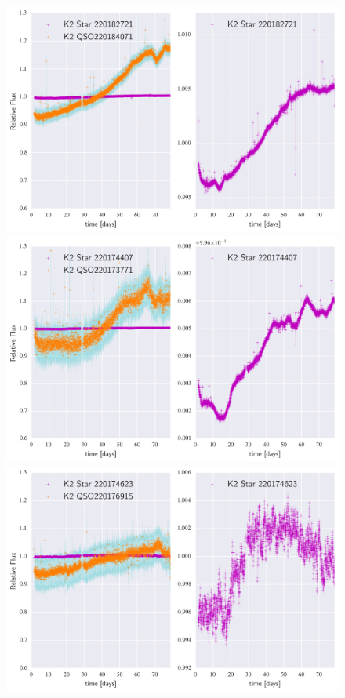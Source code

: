 \documentclass[a4paper,fleqn,usenatbib]{mnras}
\begin{document}
          
       \begin{figure}
 	\includegraphics[width=\columnwidth]{220184071NearestNeighbor.png}
 	\includegraphics[width=\columnwidth]{220173771NearestNeighbor.png}
 	\includegraphics[width=\columnwidth]{220176915NearestNeighbor.png}
       	\caption{}
       	\label{fig:example_figure}
       \end{figure}      
\end{document}
